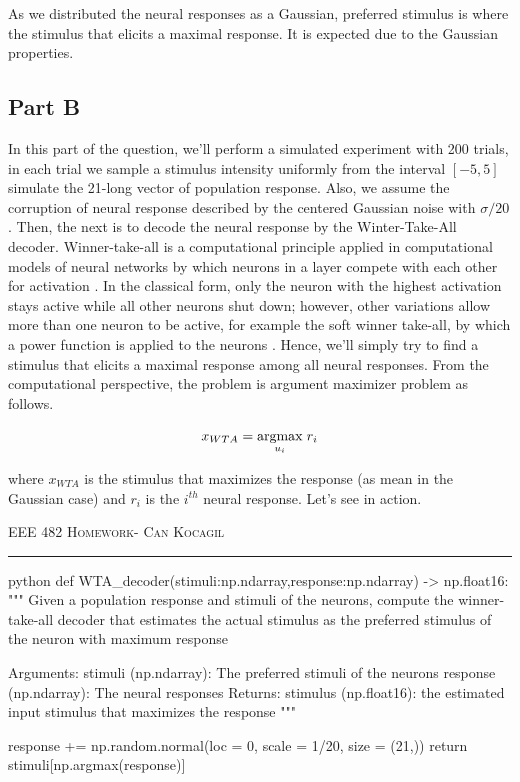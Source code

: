 \documentclass[12pt]{amsart}
\begin{document}
As we distributed the neural responses as a Gaussian, preferred stimulus is where the stimulus that elicits a maximal response. It is expected due to the Gaussian properties.

\subsection{Part B}
In this part of the question, we'll perform a simulated experiment with 200 trials, in each trial we sample a stimulus intensity uniformly from the interval $[-5,5]$ simulate the 21-long vector of population response. Also, we assume the corruption of neural response described by the centered Gaussian noise with $\sigma /20$. Then, the next is to decode the neural response by the Winter-Take-All decoder. Winner-take-all is a computational principle applied in computational models of neural networks by which neurons in a layer compete with each other for activation \cite{enwiki:913093990}. In the classical form, only the neuron with the highest activation stays active while all other neurons shut down; however, other variations allow more than one neuron to be active, for example the soft winner take-all, by which a power function is applied to the neurons \cite{enwiki:913093990}. Hence, we'll simply try to find a stimulus that elicits a maximal response among all neural responses. From the computational perspective, the problem is argument maximizer problem as follows.

\begin{equation}
    x_{WTA} = \underset{u_i}{\mathrm{argmax}} \hspace{1mm} r_i
\end{equation}

where  $x_{WTA}$ is the stimulus that maximizes the response (as mean in the Gaussian case) and $r_i$ is the $i^{th}$ neural response. Let's see in action.

\newpage
{\scshape EEE 482} \hfill {\scshape \large  Homework-\relax} \hfill {\scshape Can Kocagil}
\smallskip
\hrule
\vspace{2mm}

\begin{mintedbox}{python}
def WTA_decoder(stimuli:np.ndarray,response:np.ndarray) -> np.float16:
    """
    Given a population response and  stimuli of the
    neurons, compute the winner-take-all decoder that 
    estimates the actual stimulus as the preferred
    stimulus of the neuron with maximum response

        Arguments:
            stimuli  (np.ndarray): The preferred stimuli of the neurons
            response (np.ndarray): The neural responses
        Returns:
            stimulus (np.float16): the estimated input stimulus that maximizes the response
    """

    response += np.random.normal(loc = 0, scale = 1/20, size = (21,)) 
    return stimuli[np.argmax(response)]
\end{mintedbox}
\end{document}
